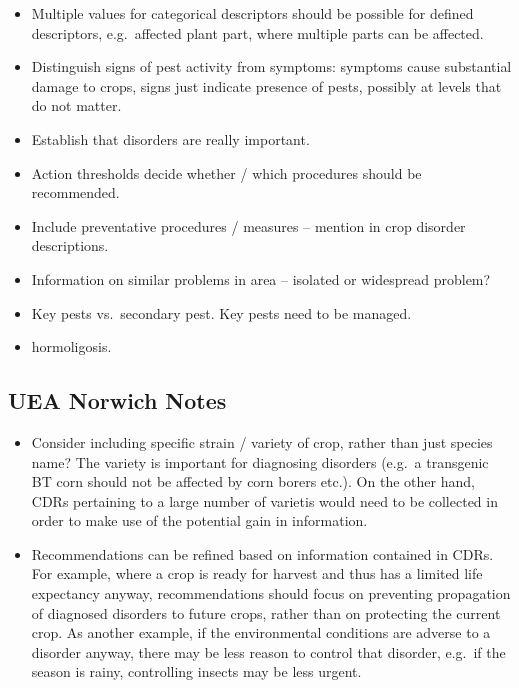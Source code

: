 \documentclass[a4paper,fleqn]{article}
\begin{document}
\begin{itemize}
\item Multiple values for categorical descriptors should be possible
  for defined descriptors, e.g.\ affected plant part, where multiple
  parts can be affected.

\item Distinguish signs of pest activity from symptoms: symptoms cause
  substantial damage to crops, signs just indicate presence of pests,
  possibly at levels that do not matter.

\item Establish that disorders are really important.

\item Action thresholds decide whether / which procedures should be
  recommended.

\item Include preventative procedures / measures -- mention in crop
  disorder descriptions.

\item Information on similar problems in area -- isolated or
  widespread problem?

\item Key pests vs.\ secondary pest. Key pests need to be managed.

\item hormoligosis.

\end{itemize}


\subsection{UEA Norwich Notes}

\begin{itemize}

\item Consider including specific strain / variety of crop, rather
  than just species name? The variety is important for diagnosing
  disorders (e.g.\ a transgenic BT corn should not be affected by corn
  borers etc.). On the other hand, CDRs pertaining to a large number
  of varietis would need to be collected in order to make use of the
  potential gain in information.

\item Recommendations can be refined based on information contained in
  CDRs. For example, where a crop is ready for harvest and thus has a
  limited life expectancy anyway, recommendations should focus on
  preventing propagation of diagnosed disorders to future crops,
  rather than on protecting the current crop. As another example, if
  the environmental conditions are adverse to a disorder anyway, there
  may be less reason to control that disorder, e.g.\ if the season is
  rainy, controlling insects may be less urgent.

\end{itemize}
\end{document}
